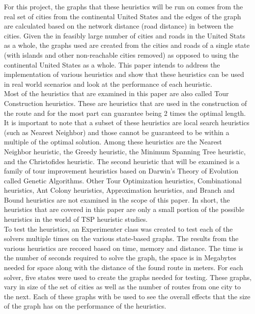\documentclass[midd]{thesis}
\newcommand{\tab}{\hspace*{2em}}
\begin{document}
\tab For this project, the graphs that these heuristics will be run on comes from the real set of cities from the continental United States and the edges of the graph are calculated based on the network distance (road distance) in between the cities. Given the in feasibly large number of cities and roads in the United Stats as a whole, the graphs used are created from the cities and roads of a single state (with islands and other non-reachable cities removed) as opposed to using the continental United States as a whole. This paper intends to address the implementation of various heuristics and show that these heuristics can be used in real world scenarios and look at the performance of each heuristic.\\
\tab Most of the heuristics that are examined in this paper are also called Tour Construction heuristics. These are heuristics that are used in the construction of the route and for the most part can guarantee being 2 times the optimal length. It is important to note that a subset of these heuristics are local search heuristics (such as Nearest Neighbor) and those cannot be guaranteed to be within a multiple of the optimal solution\cite{ttps}. Among these heuristics are the Nearest Neighbor heuristic, the Greedy heuristic, the Minimum Spanning Tree  heuristic, and the Christofides heuristic. The second heuristic that will be examined is a family of tour improvement heuristics based on Darwin's Theory of Evolution called Genetic Algorithms. Other Tour Optimization heuristics, Combinational heuristics, Ant Colony heuristics, Approximation heuristics, and Branch and Bound heuristics are not examined in the scope of this paper. In short, the heuristics that are covered in this paper are only a small portion of the possible heuristics in the world of TSP heuristic studies. \\
\tab To test the heuristics, an Experimenter class was created to test each of the solvers multiple times on the various state-based graphs. The results from the various heuristics are recored based on time, memory and distance.  The time is the number of seconds required to solve the graph, the space is in Megabytes needed for space along with the distance of the found route in meters. For each solver, five states were used to create the graphs needed for testing. These graphs, vary in size of the set of cities as well as the number of routes from one city to the next. Each of these graphs with be used to see the overall effects that the size of the graph has on the performance of the heuristics.\\
\end{document}
